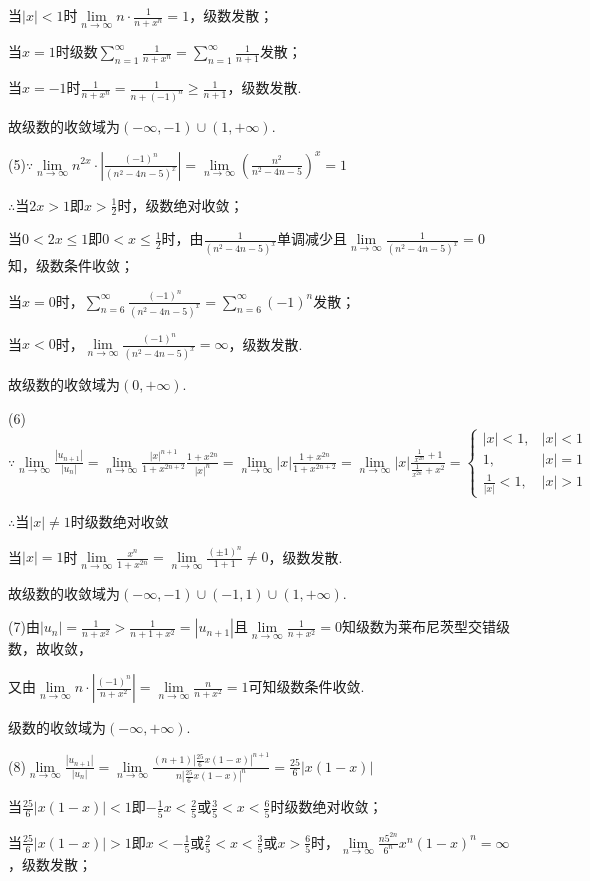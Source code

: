 \documentclass[12pt,UTF8]{ctexart}
\newcommand\Lim[0]{\lim\limits_{n\rightarrow\infty}}
\newcommand\Ser[1]{\sum_{n=#1}^\infty}
\begin{document}
\begin{enumerate}
当$|x|<1$时$\Lim n\cdot\frac1{n+x^n}=1$，级数发散；

当$x=1$时级数$\Ser{1}\frac1{n+x^n}=\Ser{1}\frac1{n+1}$发散；

当$x=-1$时$\frac1{n+x^n}=\frac1{n+(-1)^n}\geq\frac1{n+1}$，级数发散.

故级数的收敛域为$(-\infty,-1)\cup(1,+\infty)$.

(5)$\because\Lim n^{2x}\cdot|\frac{(-1)^n}{(n^2-4n-5)^x}|=\Lim(\frac{n^2}{n^2-4n-5})^x=1$

$\therefore$当$2x>1$即$x>\frac12$时，级数绝对收敛；

当$0<2x\leq1$即$0<x\leq\frac12$时，由$\frac1{(n^2-4n-5)^x}$单调减少且$\Lim\frac1{(n^2-4n-5)^x}=0$知，级数条件收敛；

当$x=0$时，$\Ser{6}\frac{(-1)^n}{(n^2-4n-5)^x}=\Ser{6}(-1)^n$发散；

当$x<0$时，$\Lim\frac{(-1)^n}{(n^2-4n-5)^x}=\infty$，级数发散.

故级数的收敛域为$(0,+\infty)$.

(6)$\because\Lim\frac{|u_{n+1}|}{|u_n|}=\Lim\frac{|x|^{n+1}}{1+x^{2n+2}}\frac{1+x^{2n}}{|x|^n}=\Lim|x|\frac{1+x^{2n}}{1+x^{2n+2}}=\Lim|x|\frac{\frac1{x^{2n}}+1}{\frac1{x^{2n}}+x^2}=\begin{cases}
|x|<1,&|x|<1\\
1,&|x|=1\\
\frac1{|x|}<1,&|x|>1
\end{cases}$

$\therefore$当$|x|\neq1$时级数绝对收敛

当$|x|=1$时$\Lim\frac{x^n}{1+x^{2n}}=\Lim\frac{(\pm1)^n}{1+1}\neq0$，级数发散.

故级数的收敛域为$(-\infty,-1)\cup(-1,1)\cup(1,+\infty)$.

(7)由$|u_n|=\frac1{n+x^2}>\frac1{n+1+x^2}=|u_{n+1}|$且$\Lim\frac1{n+x^2}=0$知级数为莱布尼茨型交错级数，故收敛，

又由$\Lim n\cdot|\frac{(-1)^n}{n+x^2}|=\Lim\frac n{n+x^2}=1$可知级数条件收敛.

级数的收敛域为$(-\infty,+\infty)$.

(8)$\Lim\frac{|u_{n+1}|}{|u_n|}=\Lim\frac{(n+1)|\frac{25}6x(1-x)|^{n+1}}{n|\frac{25}6x(1-x)|^n}=\frac{25}6|x(1-x)|$

当$\frac{25}6|x(1-x)|<1$即$-\frac15x<\frac25$或$\frac35<x<\frac65$时级数绝对收敛；

当$\frac{25}6|x(1-x)|>1$即$x<-\frac15$或$\frac25<x<\frac35$或$x>\frac65$时，$\Lim\frac{n5^{2n}}{6^n}x^n(1-x)^n=\infty$，级数发散；


\end{enumerate}
\end{document}
